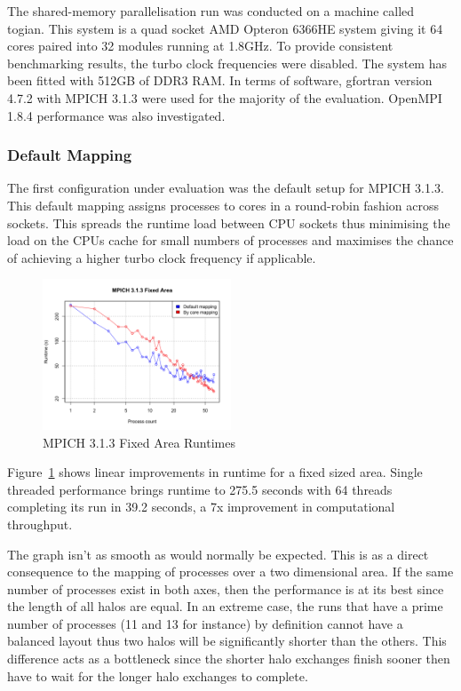 The shared-memory parallelisation run was conducted on a machine called togian.
This system is a quad socket AMD Opteron 6366HE system giving it 64 cores paired
into 32 modules running at 1.8GHz. To provide consistent benchmarking results,
the turbo clock frequencies were disabled. The system has been fitted with 512GB
of DDR3 RAM. In terms of software, gfortran version 4.7.2 with MPICH 3.1.3 were
used for the majority of the evaluation. OpenMPI 1.8.4 performance was also
investigated.

\subsubsection{Default Mapping}

The first configuration under evaluation was the default setup for MPICH 3.1.3.
This default mapping assigns processes to cores in a round-robin fashion across
sockets. This spreads the runtime load between CPU sockets thus minimising the
load on the CPUs cache for small numbers of processes and maximises the chance
of achieving a higher turbo clock frequency if applicable.

\begin{figure}
    \includegraphics[width=0.5\textwidth]{graphs/MPICH313-fixed-area.png}
    \caption{MPICH 3.1.3 Fixed Area Runtimes}
    \label{fig:mpichfixedarea}
\end{figure}

Figure~\ref{fig:mpichfixedarea} shows linear improvements in runtime for a
fixed sized area. Single threaded performance brings runtime to 275.5 seconds
with 64 threads completing its run in 39.2 seconds, a 7x improvement in
computational throughput.

The graph isn't as smooth as would normally be expected. This is as a direct
consequence to the mapping of processes over a two dimensional area. If the same
number of processes exist in both axes, then the performance is at its best
since the length of all halos are equal. In an extreme case, the runs that have
a prime number of processes (11 and 13 for instance) by definition cannot have a
balanced layout thus two halos will be significantly shorter than the others.
This difference acts as a bottleneck since the shorter halo exchanges finish
sooner then have to wait for the longer halo exchanges to complete.


